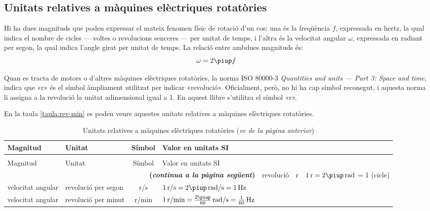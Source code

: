\subsection{Unitats relatives a màquines elèctriques rotatòries}\label{sec:unit-maq-rotativ}

Hi ha dues magnituds que poden expressar el mateix fenomen físic de rotació d'un cos; una és la freqüència $f$, expressada en hertz, la qual indica el nombre de cicles --- voltes o revolucions senceres --- per unitat de temps, i l'altra és la velocitat angular $\omega$, expressada en radiant per segon, la qual indica l'angle girat per unitat de temps. La relació entre ambdues magnituds és:
\begin{equation}
  \omega = 2 \piup f
\end{equation}

Quan es tracta de motors o d'altres màquines elèctriques rotatòries, la norma ISO 80000-3 \textit{Quantities and units --- Part 3: Space and time}, indica que «r» és el símbol àmpliament utilitzat per indicar  «revolució».  Oficialment, però, no hi ha cap símbol reconegut, i aquesta norma li assigna a la revolució la unitat  adimensional igual a 1. En aquest llibre s'utilitza el símbol «r».

En la taula \vref{taula:rev-min} es poden veure aquestes unitats relatives a màquines elèctriques rotatòries.

\begin{longtable}[h]{llcl}
   \caption{\label{taula:rev-min} Unitats relatives a màquines elèctriques rotatòries}\\
   \toprule[1pt]
    Magnitud & Unitat &  Símbol & Valor en unitats SI \\
   \midrule
   \endfirsthead
   \caption[]{Unitats relatives a màquines elèctriques rotatòries (\emph{ve de la pàgina anterior})}\\
   \toprule[1pt]
    Magnitud & Unitat &  Símbol & Valor en unitats SI \\
   \midrule
   \endhead
   \midrule
   \multicolumn{4}{r}{\sffamily\bfseries\color{NavyBlue}(\emph{continua a la pàgina següent})}
   \endfoot
   \endlastfoot
   angle pla & revolució &  \unit{r} & $\qty{1}{r} = 2\piup\unit{\,rad}$  = 1 (cicle)\\
   velocitat angular & revolució per segon &  \unit{r/s}& $\qty{1}{r/s} = 2\piup\unit{\,rad/s} = \qty{1}{Hz}$  \\
   velocitat angular & revolució per minut &  \unit{r/min}& $\qty{1}{r/min} = \frac{2\piup}{60}\unit{\,rad/s} = \frac{1}{60}\unit{\,Hz}$  \\
   \bottomrule[1pt]
\end{longtable}


